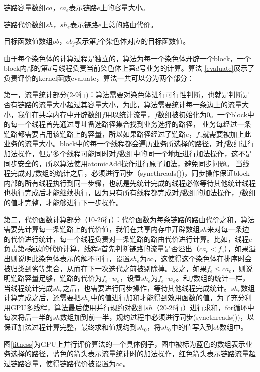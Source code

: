链路容量数组$ca$，$ca_e$表示链路$e$上的容量大小。

链路代价数组$sh$，$sh_e$表示链路$e$上总的路由代价。

目标函数值数组$ob$，$ob_j$表示第$j$个染色体对应的目标函数值。

由于每个染色体的计算过程是独立的，算法为每一个染色体开辟一个block，一个block内部的第$d$号线程负责当前染色体上第$d$号业务的计算。算法 \ref{evaluate}展示了负责评价的kernel函数evaluate，算法一共可以分为两个部分：

第一，流量统计部分(2-9行)：算法需要对染色体进行可行性判断，也就是判断是否有链路的流量大小超过其容量大小，为此，算法需要统计每一条边上的流量大小，我们在共享内存中开辟数组$f$用以统计流量，$f$数组被初始化为0。一个block中的每一个线程首先通过寻址备选路径集合找到业务选择的路径，
业务每经过一条链路都需要占用该链路上的容量，所以如果路径经过了链路$e$，$f_e$就需要被加上此业务的流量大小。block中的每一个线程都会遍历业务所选择的路径，对$f$数组进行加法操作，但是多个线程可能同时对$f$数组中的同一个地址进行加法操作，这不是同步安全的，所以算法使用atomicAdd操作进行原子加法，避免同步问题。
当线程完成对$f$数组的统计之后，必须进行同步（syncthreads())，同步操作保证block内部的所有线程执行到同一步骤，也就是先统计完成的线程必修等待其他统计线程也执行完成后才能继续执行，因为只有所有线程都完成对$f$数组的加法操作，$f$数组的值才完整，才能够进行下一步操作。

第二，代价函数计算部分（10-26行）：代价函数为每条链路的路由代价之和，算法需要先计算每一条链路上的代价值，我们在共享内存中开辟数组$sh$来对每一条边的代价进行统计，每一个线程负责对一条链路的路由代价进行计算。比如，线程$e$负责第$e$条边的代价计算，线程$e$首先判断链路的流量是否溢出（$ca_e<f_e$），如果溢出则说明此染色体表示的解不可行，设置$sh_e$为$\infty$，这使得这个染色体在排序时会被归类到劣等集合，从而在下一次迭代之前被剔除掉。反之，如果$f_e \le ca_e$，则说明链路容量足够，链路的代价为$f_e \cdot w_e$，设置$sh_e$为$f_e \cdot w_e$。和$f$数组的统计一样，当线程统计完成$sh_e$之后，也需要进行同步操作，等待其他线程完成统计。$sh_e$数组计算完成之后，还需要把$sh_e$中的值进行加和才能得到效用函数的值，为了充分利用GPU多线程，算法最后使用并行规约对数组$sh$（20-26行）进行求和，for循环中每次将后一半的$sh$数组加到前一半，规约过程中必须进行同步(syncthreads())，以保证加法过程计算完整，最终求和值规约到$sh_0$，将$sh_0$中的值写入到$ob$数组中。

图\ref{fitness}为GPU上并行评价算法的一个具体例子，图中被标为蓝色的数组表示业务选择的路径，蓝色的箭头表示流量统计时的加法操作，红色箭头表示链路流量超过链路容量，使得链路代价被设置为$\infty$。


